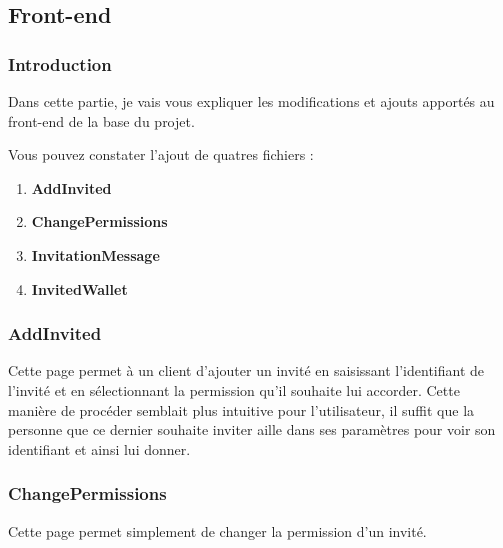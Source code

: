 \subsection{Front-end}

\subsubsection{Introduction}

\begin{flushleft}
Dans cette partie, je vais vous expliquer les modifications et ajouts apportés au front-end de la base du projet. 
\end{flushleft}

\begin{flushleft}
Vous pouvez constater l'ajout de quatres fichiers :
\end{flushleft}

\begin{enumerate}
\item \textbf{AddInvited}\newline
\item \textbf{ChangePermissions}\newline
\item \textbf{InvitationMessage}\newline
\item \textbf{InvitedWallet}\newline
\end{enumerate}

\subsubsection{AddInvited}

\begin{flushleft}
Cette page permet à un client d'ajouter un invité en saisissant l'identifiant de l'invité et en sélectionnant la permission qu'il souhaite lui accorder.
Cette manière de procéder semblait plus intuitive pour l'utilisateur, il suffit que la personne que ce dernier souhaite inviter aille dans ses paramètres pour voir son identifiant et ainsi lui donner.
\end{flushleft}

\subsubsection{ChangePermissions}

\begin{flushleft}
Cette page permet simplement de changer la permission d'un invité.
\end{flushleft}

